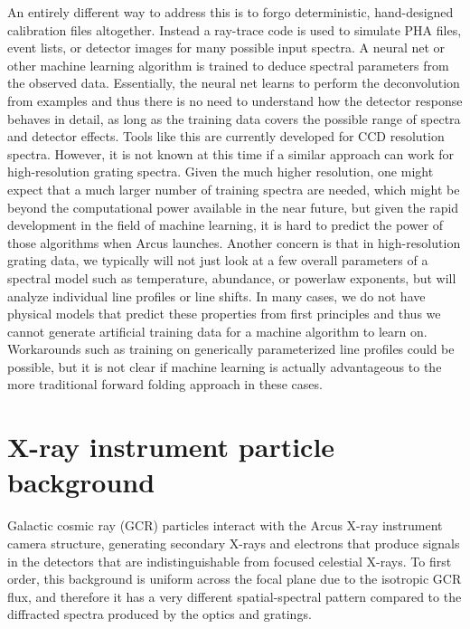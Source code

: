 \documentclass[12pt]{spieman}  %
\begin{document}
\begin{spacing}{2}
An entirely different way to address this is to forgo deterministic, hand-designed calibration files altogether. Instead a ray-trace code is used to simulate PHA files, event lists, or detector images for many possible input spectra. A neural net or other machine learning algorithm is trained to deduce spectral parameters from the observed data. Essentially, the neural net learns to perform the deconvolution from examples and thus there is no need to understand how the detector response behaves in detail, as long as the training data covers the possible range of spectra and detector effects.
Tools like this are currently developed for CCD resolution spectra\cite{2021RNAAS...5..113R,2023arXiv231118014R}. However, it is not known at this time if a similar approach can work for high-resolution grating spectra. Given the much higher resolution, one might expect that a much larger number of training spectra are needed, which might be beyond the computational power available in the near future, but given the rapid development in the field of machine learning, it is hard to predict the power of those algorithms when Arcus launches. Another concern is that in high-resolution grating data, we typically will not just look at a few overall parameters of a spectral model such as temperature, abundance, or powerlaw exponents, but will analyze individual line profiles or line shifts. In many cases, we do not have physical models that predict these properties from first principles and thus we cannot generate artificial training data for a machine algorithm to learn on. Workarounds such as training on generically parameterized line profiles could be possible, but it is not clear if machine learning is actually advantageous to the more traditional forward folding approach in these cases.

\section{X-ray instrument particle background}
\label{sect:nxb}

Galactic cosmic ray (GCR) particles interact with the Arcus X-ray instrument camera structure, generating secondary X-rays and electrons that produce signals in the detectors that are indistinguishable from focused celestial X-rays. To first order, this background is uniform across the focal plane due to the isotropic GCR flux, and therefore it has a very different spatial-spectral pattern compared to the diffracted spectra produced by the optics and gratings.


\end{spacing}
\end{document}
